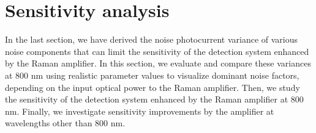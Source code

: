 \documentclass[10pt,letterpaper]{article}
\begin{document}
\section{Sensitivity analysis}
\label{sensitivity_analysis}

In the last section, we have derived the noise photocurrent variance of various noise components that can limit the sensitivity of the detection system enhanced by the Raman amplifier. In this section, we evaluate and compare these variances at 800 nm using realistic parameter values to visualize dominant noise factors, depending on the input optical power to the Raman amplifier. Then, we study the sensitivity of the detection system enhanced by the Raman amplifier at 800 nm. Finally, we investigate sensitivity improvements by the amplifier at wavelengths other than 800 nm. 
\end{document}
